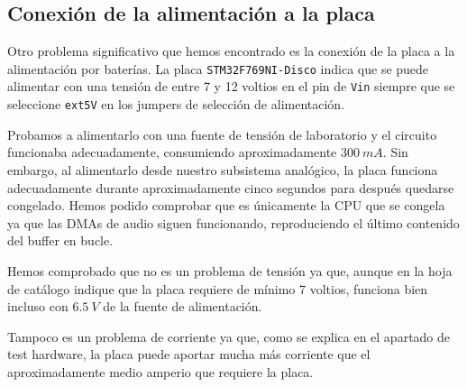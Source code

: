 \subsection{Conexión de la alimentación a la placa}

Otro problema significativo que hemos encontrado es la conexión de la placa a la alimentación por baterías. La placa \texttt{STM32F769NI-Disco} indica que se puede alimentar con una tensión de entre 7 y 12 voltios en el pin de \texttt{Vin} siempre que se seleccione \texttt{ext5V} en los jumpers de selección de alimentación.

Probamos a alimentarlo con una fuente de tensión de laboratorio y el circuito funcionaba adecuadamente, consumiendo aproximadamente $300\ mA$. Sin embargo, al alimentarlo desde nuestro subsistema analógico, la placa funciona adecuadamente durante aproximadamente cinco segundos para después quedarse congelado. Hemos podido comprobar que es únicamente la CPU que se congela ya que las DMAs de audio siguen funcionando, reproduciendo el último contenido del buffer en bucle.

Hemos comprobado que no es un problema de tensión ya que, aunque en la hoja de catálogo indique que la placa requiere de mínimo 7 voltios, funciona bien incluso con $6.5\ V$ de la fuente de alimentación.

Tampoco es un problema de corriente ya que, como se explica en el apartado de test hardware, la placa puede aportar mucha más corriente que el aproximadamente medio amperio que requiere la placa.